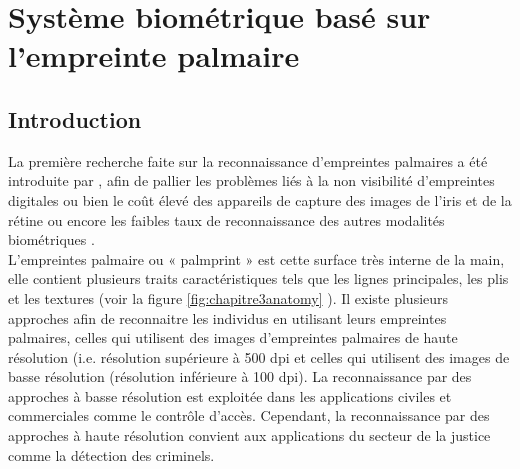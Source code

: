 \chapter{Système biométrique basé sur l'empreinte palmaire }
\label{Chapter3}
\section{Introduction}
La première recherche faite sur la reconnaissance d'empreintes palmaires a été introduite par \citep{shu1998automated}, afin de pallier les problèmes liés à la non visibilité d'empreintes digitales ou bien le coût élevé des appareils de capture des images de l'iris et de la rétine ou encore les faibles taux de reconnaissance des autres modalités biométriques \citep{Wassila2007}.
\\L'empreintes palmaire ou « palmprint » est cette surface très interne de la main, elle contient plusieurs traits caractéristiques tels que les lignes principales, les plis et les textures \citep{pavevsic2004personal} (voir la figure \ref{fig:chapitre3anatomy} ). Il existe plusieurs approches afin de reconnaitre les individus en utilisant leurs empreintes palmaires, celles qui utilisent des images d'empreintes palmaires de haute résolution (i.e. résolution supérieure à 500 dpi et celles qui utilisent des images de basse résolution (résolution inférieure à 100 dpi). La reconnaissance par des approches à basse résolution est exploitée dans les applications civiles et commerciales comme le contrôle d'accès. Cependant, la reconnaissance par des approches à haute résolution convient aux applications du secteur de la justice comme la détection des criminels.

